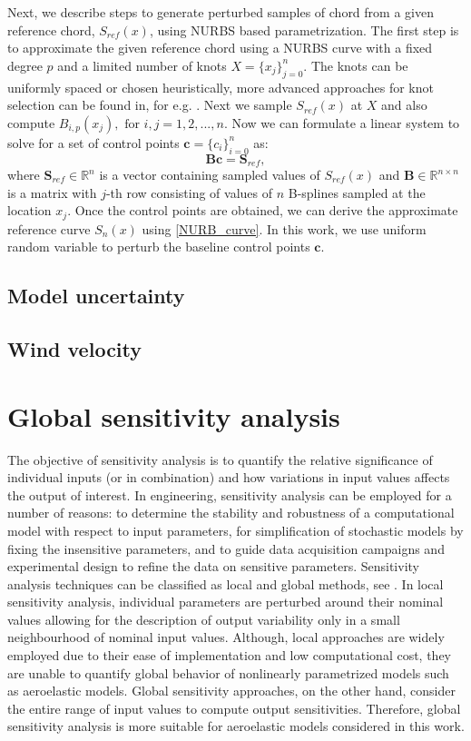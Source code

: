 \documentclass[review]{elsarticle}
\numberwithin{equation}{section}
\numberwithin{equation}{section}
\begin{document}
Next, we describe steps to generate perturbed samples of chord from a given reference chord, $S_{ref}(x)$, using NURBS based parametrization. The first step is to approximate the given reference chord using a NURBS curve with a fixed degree $p$ and a limited number of knots $X =\{x_j\}_{j=0}^n$. The knots can be uniformly spaced or chosen heuristically, more advanced approaches for knot selection can be found in, for e.g. \cite{razdan1999knot,LI2005791}. Next we sample $S_{ref}(x)$ at $X$ and also compute $B_{i,p}(x_j), \text{ for }i, j = 1,2, ..., n$.  Now we can formulate a linear system to solve for a set of control points $\mathbf{c}=\{c_i\}_{i=0}^n$ as:
\begin{equation}\label{nurbs_inversion}
\mathbf{B}\mathbf{c} = \mathbf{S}_{ref},
\end{equation}
where $\mathbf{S}_{ref}\in\mathbb{R}^{n}$ is a vector containing sampled values of $S_{ref}(x)$ and $\mathbf{B}\in \mathbb{R}^{n\times n}$ is a matrix with $j$-th row consisting of values of $n$ B-splines sampled at the location $x_j$. Once the control points are obtained, we can derive the approximate reference curve $S_n(x)$ using \eqref{NURB_curve}. In this work, we use uniform random variable to perturb the baseline control points $\mathbf{c}$.
 
\subsection{Model uncertainty}
\subsection{Wind velocity}
\section{Global sensitivity analysis}\label{sec:GSA}
The objective of sensitivity analysis is to quantify the relative significance of individual inputs (or in combination) and how variations in input values affects the output of interest. In engineering, sensitivity analysis can be employed for a number of reasons: to determine the stability and robustness of a computational model with respect to input parameters, for simplification of stochastic models by fixing the insensitive parameters, and to guide data acquisition campaigns and experimental design to refine the data on sensitive parameters. Sensitivity analysis techniques can be classified as local and global methods, see \cite{RSmith}. In local sensitivity analysis, individual parameters are perturbed around their nominal values allowing for the description of output variability only in a small neighbourhood of nominal input values. Although, local approaches are widely employed due to their ease of implementation and low computational cost, they are unable to quantify global behavior of nonlinearly parametrized models such as aeroelastic models. Global sensitivity approaches, on the other hand, consider the entire range of input values to compute output sensitivities. Therefore, global sensitivity analysis is more suitable for aeroelastic models considered in this work.  
\end{document}
